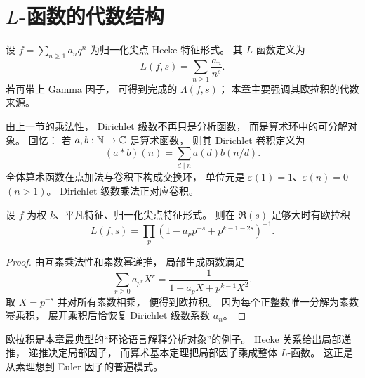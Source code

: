 \section{$L$-函数的代数结构}
\begin{definition}
设 $f=\sum_{n\ge 1}a_nq^n$ 为归一化尖点 Hecke 特征形式。
其 $L$-函数定义为
\[ L(f,s)=\sum_{n\ge 1}\frac{a_n}{n^s}. \]
若再带上 Gamma 因子，
可得到完成的 $\Lambda(f,s)$；
本章主要强调其欧拉积的代数来源。
\end{definition}
由上一节的乘法性，
Dirichlet 级数不再只是分析函数，
而是算术环中的可分解对象。
回忆：
若 $a,b:\mathbb{N}\to\mathbb{C}$ 是算术函数，
则其 Dirichlet 卷积定义为
\[ (a*b)(n)=\sum_{d\mid n}a(d)b(n/d). \]
全体算术函数在点加法与卷积下构成交换环，
单位元是
$\varepsilon(1)=1$、$\varepsilon(n)=0$ $(n>1)$。
Dirichlet 级数乘法正对应卷积。
\begin{theorem}
设 $f$ 为权 $k$、平凡特征、归一化尖点特征形式。
则在 $\Re(s)$ 足够大时有欧拉积
\[ L(f,s)=\prod_p \left(1-a_pp^{-s}+p^{k-1-2s}\right)^{-1}. \]
\end{theorem}
\begin{proof}
由互素乘法性和素数幂递推，
局部生成函数满足
\[ \sum_{r\ge 0} a_{p^r}X^r=\frac{1}{1-a_pX+p^{k-1}X^2}. \]
取 $X=p^{-s}$ 并对所有素数相乘，
便得到欧拉积。
因为每个正整数唯一分解为素数幂乘积，
展开乘积后恰恢复 Dirichlet 级数系数 $a_n$。
\end{proof}
\begin{remark}
欧拉积是本章最典型的“环论语言解释分析对象”的例子。
Hecke 关系给出局部递推，
递推决定局部因子，
而算术基本定理把局部因子乘成整体 $L$-函数。
这正是从素理想到 Euler 因子的普遍模式。
\end{remark}
